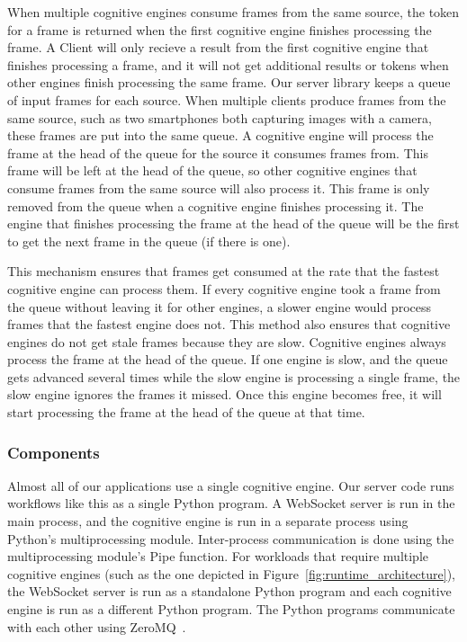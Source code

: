 When multiple cognitive engines consume frames from the same source, the token
for a frame is returned when the first cognitive engine finishes processing the
frame. A Client will only recieve a result from the first cognitive engine that
finishes processing a frame, and it will not get additional results or tokens
when other engines finish processing the same frame. Our server library keeps a
queue of input frames for each source. When multiple clients produce frames from
the same source, such as two smartphones both capturing images with a camera,
these frames are put into the same queue. A cognitive engine will process the
frame at the head of the queue for the source it consumes frames from. This
frame will be left at the head of the queue, so other cognitive engines that
consume frames from the same source will also process it. This frame is only
removed from the queue when a cognitive engine finishes processing it. The
engine that finishes processing the frame at the head of the queue will be the
first to get the next frame in the queue (if there is one).

This mechanism ensures that frames get consumed at the
rate that the fastest cognitive engine can process them. If every cognitive
engine took a frame from the queue without leaving it for other engines, a
slower engine would process frames that the fastest engine does not.
This method also ensures that cognitive engines do not get stale
frames because they are slow. Cognitive engines always process the frame at the
head of the queue. If one engine is slow, and the queue gets advanced several
times while the slow engine is processing a single frame, the slow engine
ignores the frames it missed. Once this engine becomes free, it will start
processing the frame at the head of the queue at that time.

\subsubsection{Components}

Almost all of our applications use a single cognitive engine. Our server code
runs workflows like this as a single Python program. A WebSocket server is run
in the main process, and the cognitive engine is run in a separate process using
Python's multiprocessing module. Inter-process communication is done using the
multiprocessing module's Pipe function. For workloads that require multiple
cognitive engines (such as the one depicted in
Figure~\ref{fig:runtime_architecture}),
the WebSocket server is run as a standalone Python program and each cognitive
engine is run as a different Python program. The Python programs communicate
with each other using ZeroMQ~\cite{zmq}.

